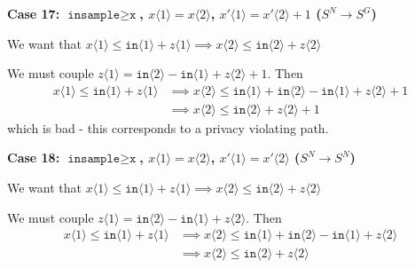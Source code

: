 \documentclass[12pt]{article}
\newcommand{\gguard}[1][x]{\texttt{insample}\geq \texttt{#1}}
\newcommand{\brangle}[1]{\langle #1 \rangle}
\theoremstyle{definition}
\begin{document}
\textbf{Case 17: $\gguard$, $x\brangle{1}  = x \brangle{2}$, $x'\brangle{1} = x' \brangle{2}+1$ ($S^N\to S^G$)}

We want that $x\langle 1 \rangle \leq \texttt{in}\langle 1\rangle + z\brangle{1}\implies x \brangle{2} \leq \texttt{in}\brangle{2} + z\brangle{2}$

We must couple $z\brangle{1} =\texttt{in}\brangle{2}-\texttt{in}\brangle{1} +z\brangle{2}+1$.
Then \begin{align*}
	x\langle 1 \rangle \leq \texttt{in}\langle 1\rangle + z\brangle{1}&\implies x\brangle{2} \leq \texttt{in}\brangle{1} + \texttt{in}\brangle{2}-\texttt{in}\brangle{1} +z\brangle{2}+1\\
	&\implies x\brangle{2} \leq \texttt{in}\brangle{2} + z\brangle{2}+1
\end{align*}
which is bad - this corresponds to a privacy violating path.

\textbf{Case 18: $\gguard$, $x\brangle{1}  = x \brangle{2}$, $x'\brangle{1} = x' \brangle{2}$ ($S^N\to S^N$)}

We want that $x\langle 1 \rangle \leq \texttt{in}\langle 1\rangle + z\brangle{1}\implies x \brangle{2} \leq \texttt{in}\brangle{2} + z\brangle{2}$

We must couple $z\brangle{1} =\texttt{in}\brangle{2}-\texttt{in}\brangle{1} +z\brangle{2}$.
Then \begin{align*}
	x\langle 1 \rangle \leq \texttt{in}\langle 1\rangle + z\brangle{1}&\implies x\brangle{2} \leq \texttt{in}\brangle{1} + \texttt{in}\brangle{2}-\texttt{in}\brangle{1} +z\brangle{2}\\
	&\implies x\brangle{2} \leq \texttt{in}\brangle{2} + z\brangle{2}
\end{align*}
\end{document}
